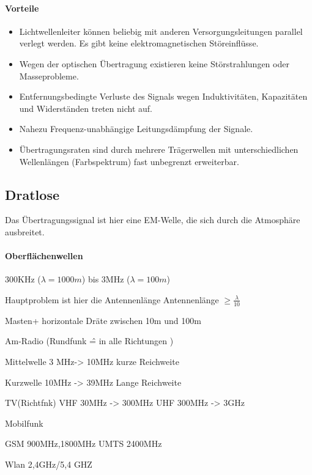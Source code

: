 \documentclass[a4paper,10pt]{article}
\begin{document}
\paragraph{Vorteile}
\begin{itemize}
 \item Lichtwellenleiter können beliebig mit anderen Versorgungsleitungen parallel verlegt werden. Es gibt keine elektromagnetischen Störeinflüsse.
 \item Wegen der optischen Übertragung existieren keine Störstrahlungen oder Masseprobleme.
 \item Entfernungsbedingte Verluste des Signals wegen Induktivitäten, Kapazitäten und Widerständen treten nicht auf.
 \item Nahezu Frequenz-unabhängige Leitungsdämpfung der Signale.
 \item Übertragungsraten sind durch mehrere Trägerwellen mit unterschiedlichen Wellenlängen (Farbspektrum) fast unbegrenzt erweiterbar.
\end{itemize}

\subsection{Dratlose}

Das Übertragungssignal ist hier eine EM-Welle, die sich durch die Atmosphäre ausbreitet.

\paragraph{Oberflächenwellen}


300KHz ($\lambda = 1000m $) bis 3MHz ($\lambda = 100m $)


%
%

Hauptproblem ist hier die Antennenlänge
Antennenlänge $\geq \frac{\lambda}{10}$ 

Masten+ horizontale Dräte zwischen 10m und 100m

Am-Radio (Rundfunk \^= in alle Richtungen )

Mittelwelle 3 MHz-> 10MHz
kurze Reichweite

Kurzwelle 10MHz -> 39MHz
Lange Reichweite


TV(Richtfnk)
VHF 30MHz -> 300MHz
UHF 300MHz -> 3GHz


Mobilfunk

GSM 900MHz,1800MHz
UMTS 2400MHz

Wlan 2,4GHz/5,4 GHZ
\end{document}
